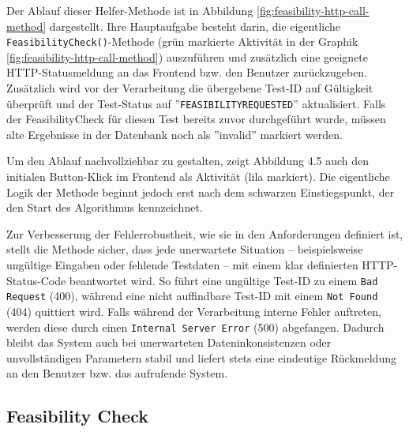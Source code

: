 Der Ablauf dieser Helfer-Methode ist in Abbildung \ref{fig:feasibility-http-call-method} dargestellt. Ihre Hauptaufgabe besteht darin, die eigentliche \texttt{FeasibilityCheck()}-Methode (grün markierte Aktivität in der Graphik \ref{fig:feasibility-http-call-method}) auszuführen und zusätzlich eine geeignete HTTP-Statusmeldung an das Frontend bzw. den Benutzer zurückzugeben. Zusätzlich wird vor der Verarbeitung die übergebene Test-ID auf Gültigkeit überprüft und der Test-Status auf ''\texttt{FEASIBILITYREQUESTED}'' aktualisiert. Falls der FeasibilityCheck für diesen Test bereits zuvor durchgeführt wurde, müssen alte Ergebnisse in der Datenbank noch als ''invalid'' markiert werden.

Um den Ablauf nachvollziehbar zu gestalten, zeigt Abbildung 4.5 auch den initialen Button-Klick im Frontend als Aktivität (lila markiert). Die eigentliche Logik der Methode beginnt jedoch erst nach dem schwarzen Einstiegspunkt, der den Start des Algorithmus kennzeichnet.

Zur Verbesserung der Fehlerrobustheit, wie sie in den Anforderungen definiert ist, stellt die Methode sicher, dass jede unerwartete Situation – beispielsweise ungültige Eingaben oder fehlende Testdaten – mit einem klar definierten HTTP-Status-Code beantwortet wird. So führt eine ungültige Test-ID zu einem \texttt{Bad Request} (400), während eine nicht auffindbare Test-ID mit einem \texttt{Not Found} (404) quittiert wird. Falls während der Verarbeitung interne Fehler auftreten, werden diese durch einen \texttt{Internal Server Error} (500) abgefangen. Dadurch bleibt das System auch bei unerwarteten Dateninkonsistenzen oder unvollständigen Parametern stabil und liefert stets eine eindeutige Rückmeldung an den Benutzer bzw. das aufrufende System.

\subsection{Feasibility Check}


